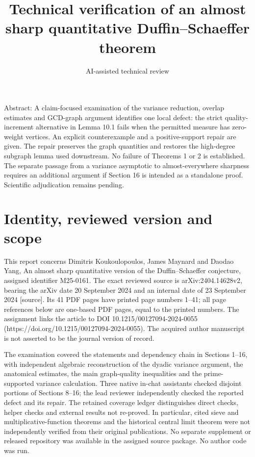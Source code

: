 \documentclass[10pt]{article}
\title{Technical verification of an almost sharp quantitative Duffin–Schaeffer theorem}
\author{AI-assisted technical review}
\date{}
\begin{document}
\maketitle
Abstract: A claim-focused examination of the variance reduction, overlap estimates and GCD-graph argument identifies one local defect: the strict quality-increment alternative in Lemma 10.1 fails when the permitted measure has zero-weight vertices. An explicit counterexample and a positive-support repair are given. The repair preserves the graph quantities and restores the high-degree subgraph lemma used downstream. No failure of Theorems 1 or 2 is established. The separate passage from a variance asymptotic to almost-everywhere sharpness requires an additional argument if Section 16 is intended as a standalone proof. Scientific adjudication remains pending.\par
\section*{Identity, reviewed version and scope}
This report concerns Dimitris Koukoulopoulos, James Maynard and Daodao Yang, An almost sharp quantitative version of the Duffin–Schaeffer conjecture, assigned identifier M25-0161. The exact reviewed source is arXiv:2404.14628v2, bearing the arXiv date 20 September 2024 and an internal date of 23 September 2024 [source]. Its 41 PDF pages have printed page numbers 1–41; all page references below are one-based PDF pages, equal to the printed numbers. The assignment links the article to DOI 10.1215/00127094-2024-0055 (https://doi.org/10.1215/00127094-2024-0055). The acquired author manuscript is not asserted to be the journal version of record.\par
The examination covered the statements and dependency chain in Sections 1–16, with independent algebraic reconstruction of the dyadic variance argument, the anatomical estimates, the main graph-quality inequalities and the prime-supported variance calculation. Three native in-chat assistants checked disjoint portions of Sections 8–16; the lead reviewer independently checked the reported defect and its repair. The retained coverage ledger distinguishes direct checks, helper checks and external results not re-proved. In particular, cited sieve and multiplicative-function theorems and the historical central limit theorem were not independently verified from their original publications. No separate supplement or released repository was available in the assigned source package. No author code was run.\par
\end{document}
